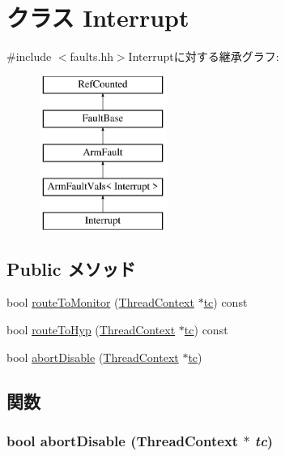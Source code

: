 \hypertarget{classArmISA_1_1Interrupt}{
\section{クラス Interrupt}
\label{classArmISA_1_1Interrupt}
}


{\ttfamily \#include $<$faults.hh$>$}Interruptに対する継承グラフ:\begin{figure}[H]
\begin{center}
\leavevmode
\includegraphics[height=5cm]{classArmISA_1_1Interrupt}
\end{center}
\end{figure}
\subsection*{Public メソッド}
\begin{DoxyCompactItemize}
\item 
bool \hyperlink{classArmISA_1_1Interrupt_afd7a21fdb010230ad53094254739dde8}{routeToMonitor} (\hyperlink{classThreadContext}{ThreadContext} $\ast$\hyperlink{namespaceArmISA_a5aff829af55e65b802d83dfcef4e9dd0}{tc}) const 
\item 
bool \hyperlink{classArmISA_1_1Interrupt_a16facd13ba8e6d15d2b865882c379d5f}{routeToHyp} (\hyperlink{classThreadContext}{ThreadContext} $\ast$\hyperlink{namespaceArmISA_a5aff829af55e65b802d83dfcef4e9dd0}{tc}) const 
\item 
bool \hyperlink{classArmISA_1_1Interrupt_a92a741baab278ed029d84b0fe979e1b8}{abortDisable} (\hyperlink{classThreadContext}{ThreadContext} $\ast$\hyperlink{namespaceArmISA_a5aff829af55e65b802d83dfcef4e9dd0}{tc})
\end{DoxyCompactItemize}


\subsection{関数}
\hypertarget{classArmISA_1_1Interrupt_a92a741baab278ed029d84b0fe979e1b8}{
\subsubsection[{abortDisable}]{\setlength{\rightskip}{0pt plus 5cm}bool abortDisable ({\bf ThreadContext} $\ast$ {\em tc})}}
\label{classArmISA_1_1Interrupt_a92a741baab278ed029d84b0fe979e1b8}


